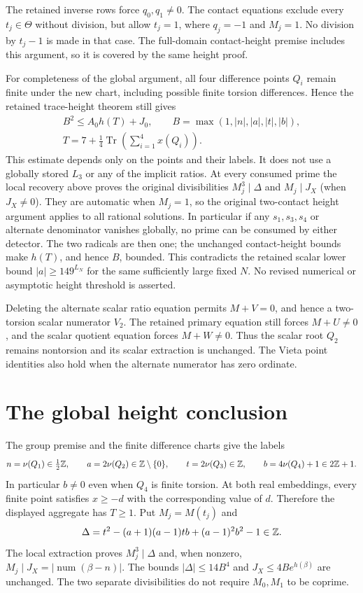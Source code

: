 \documentclass[11pt,a4paper]{article}
\begin{document}
The retained inverse rows force $q_0,q_1\ne0$. The contact equations
exclude every $t_j\in\Theta$ without division, but allow $t_j=1$,
where $q_j=-1$ and $M_j=1$. No division by $t_j-1$ is made in that
case. The full-domain contact-height premise includes this argument,
so it is covered by the same height proof.

For completeness of the global argument, all four difference points
$Q_i$ remain finite under the new chart, including possible finite
torsion differences. Hence the retained trace-height theorem still gives
\begin{equation}\label{eq:trace-height}
 \begin{gathered}
 B^2\le A_0h(T)+J_0,\qquad
 B=\max(1,|n|,|a|,|t|,|b|),\\
 T=7+\tfrac14\operatorname{Tr}\!\left(\sum_{i=1}^4x(Q_i)\right).
 \end{gathered}
\end{equation}
This estimate depends only on the points and their labels. It does not
use a globally stored $L_3$ or any of the implicit ratios. At every
consumed prime the local recovery above proves the original divisibilities
$M_j^3\mid\Delta$ and $M_j\mid J_X$ (when $J_X\ne0$). They are
automatic when $M_j=1$, so the original two-contact height argument
applies to all rational solutions. In particular if any $s_1,s_3,s_4$
or alternate denominator vanishes globally, no prime can be consumed
by either detector. The two radicals are then one; the unchanged
contact-height bounds make $h(T)$, and hence $B$, bounded. This
contradicts the retained scalar lower bound $|a|\ge149^{L_N}$ for
the same sufficiently large fixed $N$. No revised numerical or
asymptotic height threshold is asserted.

Deleting the alternate scalar ratio equation permits $M+V=0$,
and hence a two-torsion scalar numerator $V_2$. The retained primary
equation still forces $M+U\ne0$, and the scalar quotient equation
forces $M+W\ne0$. Thus the scalar root $Q_2$ remains nontorsion and
its scalar extraction is unchanged. The Vieta point identities also
hold when the alternate numerator has zero ordinate.

\section{The global height conclusion}

The group premise and the finite difference charts give the labels
\[
 n=\nu(Q_1)\in\tfrac12\mathbb Z,\qquad
 a=2\nu(Q_2)\in\mathbb Z\setminus\{0\},\qquad
 t=2\nu(Q_3)\in\mathbb Z,\qquad
 b=4\nu(Q_4)+1\in2\mathbb Z+1.
\]
In particular $b\ne0$ even when $Q_4$ is finite torsion.
At both real embeddings, every finite point satisfies $x\ge-d$
with the corresponding value of $d$. Therefore the displayed
aggregate has $T\ge1$. Put $M_j=M(t_j)$ and
\[
 \Delta=t^2-(a+1)(a-1)tb+(a-1)^2b^2-1\in\mathbb Z.
\]
The local extraction proves $M_j^3\mid\Delta$ and, when nonzero,
$M_j\mid J_X=|\operatorname{num}(\beta-n)|$. The bounds
$|\Delta|\le14B^4$ and $J_X\le4B e^{h(\beta)}$ are unchanged.
The two separate divisibilities do not require $M_0,M_1$ to be
coprime.
\end{document}
